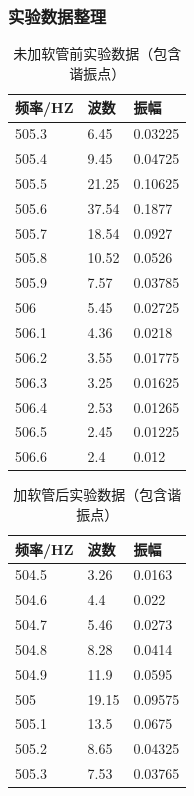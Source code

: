 \documentclass[dvipsnames, svgnames,a4paper,11pt]{article}
\begin{document}
		\subsubsection{实验数据整理}
		\begin{table}[]
			\begin{tabular}{|l|l|l|}
			\hline
			频率/HZ & 波数    & 振幅      \\ \hline
			505.3 & 6.45  & 0.03225 \\ \hline
			505.4 & 9.45  & 0.04725 \\ \hline
			505.5 & 21.25 & 0.10625 \\ \hline
			505.6 & 37.54 & 0.1877  \\ \hline
			505.7 & 18.54 & 0.0927  \\ \hline
			505.8 & 10.52 & 0.0526  \\ \hline
			505.9 & 7.57  & 0.03785 \\ \hline
			506   & 5.45  & 0.02725 \\ \hline
			506.1 & 4.36  & 0.0218  \\ \hline
			506.2 & 3.55  & 0.01775 \\ \hline
			506.3 & 3.25  & 0.01625 \\ \hline
			506.4 & 2.53  & 0.01265 \\ \hline
			506.5 & 2.45  & 0.01225 \\ \hline
			506.6 & 2.4   & 0.012   \\ \hline
			\end{tabular}
			\caption{未加软管前实验数据（包含谐振点）}
		    \label{未加软管前实验数据}
		\end{table}
			\begin{table}[!ht]
				\centering
				\begin{tabular}{|l|l|l|}
				\hline
					频率/HZ & 波数 & 振幅  \\ \hline
					504.5 & 3.26 & 0.0163  \\ \hline
					504.6 & 4.4 & 0.022  \\ \hline
					504.7 & 5.46 & 0.0273  \\ \hline
					504.8 & 8.28 & 0.0414  \\ \hline
					504.9 & 11.9 & 0.0595  \\ \hline
					505 & 19.15 & 0.09575  \\ \hline
					505.1 & 13.5 & 0.0675  \\ \hline
					505.2 & 8.65 & 0.04325  \\ \hline
					505.3 & 7.53 & 0.03765  \\ \hline
				 \end{tabular}
				 \caption{加软管后实验数据（包含谐振点）}
		           \label{加软管后实验数据}
			\end{table}
	
\end{document}
